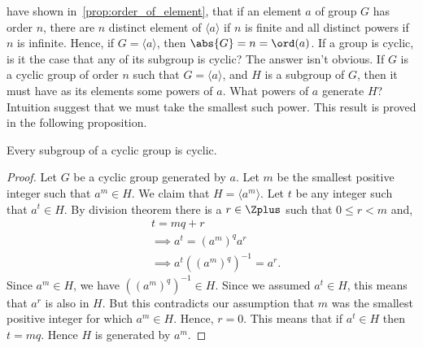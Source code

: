 have shown in~\ref{prop:order_of_element}, that if an element $a$ of group $G$ has order $n$, there are $n$
distinct element of $\langle a \rangle$ if $n$ is finite and all distinct powers if $n$ is infinite. 
Hence, if $G = \langle a \rangle$, then $\abs{G} = n = \ord(a)$. If a
group is cyclic, is it the case that any of its subgroup is cyclic? The answer isn't obvious. If $G$ is a cyclic
group of order $n$ such that $G = \langle a \rangle$, and $H$ is a subgroup of $G$, then it must have as its 
elements some powers of $a$. What powers of $a$ generate $H$? Intuition suggest that we must take the smallest
such power. This result is proved in the following proposition.
\begin{Proposition}
    Every subgroup of a cyclic group is cyclic.
\end{Proposition}
\begin{proof}
    Let $G$ be a cyclic group generated by $a$. Let $m$ be the smallest positive integer such that $a^m \in
    H$. We claim that $H = \langle a^m \rangle$. Let $t$ be any integer such that $a^t \in H$. By division
    theorem there is a $r\in\Zplus$ such that $0\leq r < m$ and,
    \begin{align*}
	&t = mq + r \\
	&\implies a^t = {(a^m)}^q a^r\\
	&\implies a^t {({(a^m)}^q)}^{-1} = a^r.
    \end{align*}
    Since $a^m \in H$, we have ${({(a^m)}^q)}^{-1} \in H$. Since we assumed $a^t \in H$, this means that $a^r$
    is also in $H$. But this contradicts our assumption that $m$ was the smallest positive integer for which
    $a^m \in H$. Hence, $r = 0$. This means that if $a^t \in H$ then $t = mq$. Hence $H$ is generated by
    $a^m$.
\end{proof}
